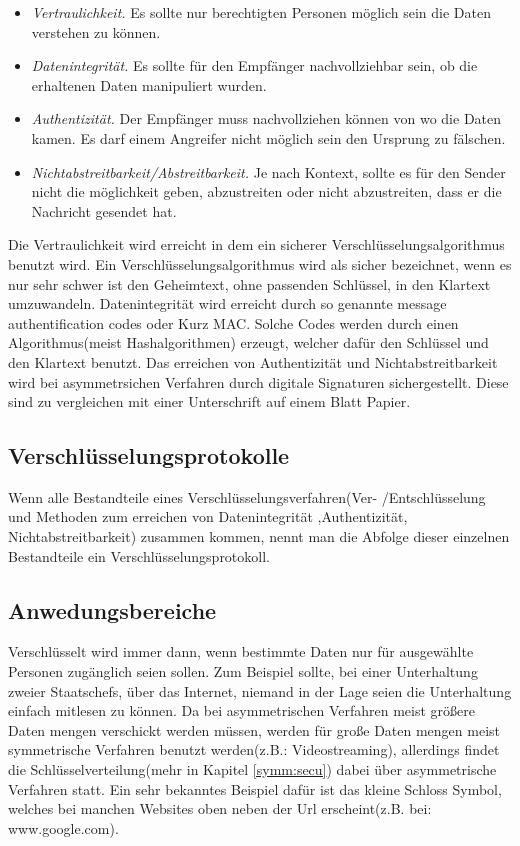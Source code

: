 \documentclass[a4paper,12pt,titlepage]{article}
\begin{document}
\begin{itemize}
\item \textit{Vertraulichkeit.} Es sollte nur berechtigten Personen möglich sein die Daten verstehen zu können. 

\item \textit{Datenintegrität.} Es sollte für den Empfänger nachvollziehbar sein, ob die erhaltenen Daten manipuliert wurden.

\item \textit{Authentizität.} Der Empfänger muss nachvollziehen können von wo die Daten kamen. Es darf einem Angreifer nicht möglich sein den Ursprung zu fälschen.

\item \textit{Nichtabstreitbarkeit/Abstreitbarkeit.} Je nach Kontext, sollte es für den Sender nicht die möglichkeit geben, abzustreiten oder nicht abzustreiten, dass er die Nachricht gesendet hat.
\end{itemize} %
Die Vertraulichkeit wird erreicht in dem ein sicherer Verschlüsselungsalgorithmus benutzt wird. Ein Verschlüsselungsalgorithmus wird als sicher bezeichnet, wenn es nur sehr schwer ist den Geheimtext, ohne passenden Schlüssel, in den Klartext umzuwandeln. Datenintegrität wird erreicht durch so genannte message authentification codes oder Kurz MAC. Solche Codes werden durch einen Algorithmus(meist Hashalgorithmen) erzeugt, welcher dafür den Schlüssel und den Klartext benutzt. Das erreichen von Authentizität und Nichtabstreitbarkeit wird bei asymmetrsichen Verfahren durch digitale Signaturen sichergestellt. Diese sind zu vergleichen mit einer Unterschrift auf einem Blatt Papier.%
 
\subsection{Verschlüsselungsprotokolle}
Wenn alle Bestandteile eines Verschlüsselungsverfahren(Ver- /Entschlüsselung und Methoden zum erreichen von Datenintegrität ,Authentizität, Nichtabstreitbarkeit) zusammen kommen, nennt man die Abfolge dieser einzelnen Bestandteile ein Verschlüsselungsprotokoll.

\subsection{Anwedungsbereiche}
Verschlüsselt wird immer dann, wenn bestimmte Daten nur für ausgewählte Personen zugänglich seien sollen. Zum Beispiel sollte, bei einer Unterhaltung zweier Staatschefs, über das Internet, niemand in der Lage seien die Unterhaltung einfach mitlesen zu können.
Da bei asymmetrischen Verfahren meist größere Daten mengen verschickt werden müssen, werden für große Daten mengen meist symmetrische Verfahren benutzt werden(z.B.: Videostreaming), allerdings findet die Schlüsselverteilung(mehr in Kapitel \ref{symm:secu}) dabei über asymmetrische Verfahren statt. Ein sehr bekanntes Beispiel dafür ist das kleine Schloss Symbol, welches bei manchen Websites oben neben der Url erscheint(z.B. bei: www.google.com).
\end{document}
